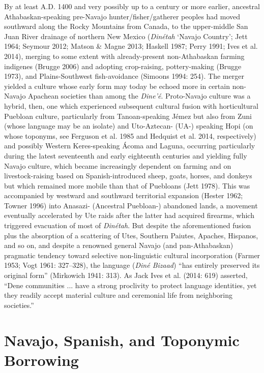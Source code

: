 By at least A.D. 1400 and very possibly up to a century or more earlier, ancestral Athabaskan-speaking pre-Navajo hunter/fisher/gatherer peoples had moved southward along the Rocky Mountains from Canada, to the upper-middle San Juan River drainage of northern New Mexico (\textit{Dinétah} ‘Navajo Country’; Jett 1964; Seymour 2012; Matson \& Magne 2013; Haskell 1987; Perry 1991; Ives et al. 2014), merging to some extent with already-present non-Athabaskan farming indigenes (Brugge 2006) and adopting crop-raising, pottery-making (Brugge 1973), and Plains-Southwest fish-avoidance (Simoons 1994: 254).  The merger yielded a culture whose early form may today be echoed more in certain non-Navajo Apachean societies than among the \textit{Dine’é}.  Proto-Navajo culture was a hybrid, then, one which experienced subsequent cultural fusion with horticultural Puebloan culture, particularly from Tanoan-speaking Jémez but also from Zuni (whose language may be an isolate) and Uto-Aztecan- (UA-) speaking Hopi (on whose toponyms, see Ferguson et al. 1985 and Hedquist et al. 2014, respectively) and possibly Western Keres-speaking Ácoma and Laguna, occurring particularly during the latest seventeenth and early eighteenth centuries and yielding fully Navajo culture, which became increasingly dependent on farming and on livestock-raising based on Spanish-introduced sheep, goats, horses, and donkeys but which remained more mobile than that of Puebloans (Jett 1978).  This was accompanied by westward and southward territorial expansion (Hester 1962; Towner 1996) into Anasazi- (Ancestral Puebloan-) abandoned lands, a movement eventually accelerated by Ute raids after the latter had acquired firearms, which triggered evacuation of most of \textit{Dinétah}.  But despite the aforementioned fusion plus the absorption of a scattering of Utes, Southern Paiutes, Apaches, Hispanos, and so on, and despite a renowned general Navajo (and pan-Athabaskan) pragmatic tendency toward selective non-linguistic cultural incorporation (Farmer 1953; Vogt 1961: 327–328), the language (\textit{Diné Bizaad}) “has entirely preserved its original form” (Mirkowich 1941: 313).  As Jack Ives et al. (2014: 619) asserted, “Dene communities ... have a strong proclivity to protect language identities, yet they readily accept material culture and ceremonial life from neighboring societies.”

\section{Navajo, Spanish, and Toponymic Borrowing}

